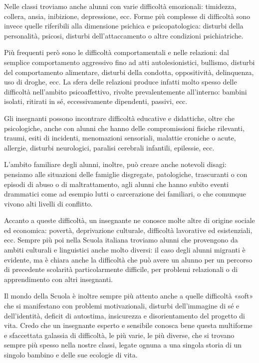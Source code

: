 Nelle classi troviamo anche alunni con varie difficoltà emozionali: timidezza, collera, ansia,
inibizione, depressione, ecc. Forme più complesse di difficoltà sono invece quelle riferibili alla
dimensione psichica e psicopatologica: disturbi della personalità, psicosi, disturbi
dell'attaccamento o altre condizioni psichiatriche.

Più frequenti però sono le difficoltà comportamentali e nelle relazioni: dal semplice
comportamento aggressivo fino ad atti autolesionistici, bullismo, disturbi del comportamento
alimentare, disturbi della condotta, oppositività, delinquenza, uso di droghe, ecc. La sfera delle
relazioni produce infatti molto spesso delle difficoltà nell'ambito psicoaffettivo, rivolte
prevalentemente all'interno: bambini isolati, ritirati in sé, eccessivamente dipendenti, passivi, ecc.

Gli insegnanti possono incontrare difficoltà educative e didattiche, oltre che psicologiche,
anche con alunni che hanno delle compromissioni fisiche rilevanti, traumi, esiti di incidenti,
menomazioni sensoriali, malattie croniche o acute, allergie, disturbi neurologici, paralisi cerebrali
infantili, epilessie, ecc.

L'ambito familiare degli alunni, inoltre, può creare anche notevoli disagi: pensiamo alle
situazioni delle famiglie disgregate, patologiche, trascuranti o con episodi di abuso o di
maltrattamento, agli alunni che hanno subito eventi drammatici come ad esempio lutti o
carcerazione dei familiari, o che comunque vivono alti livelli di conflitto.

Accanto a queste difficoltà, un insegnante ne conosce molte altre di origine sociale ed
economica: povertà, deprivazione culturale, difficoltà lavorative ed esistenziali, ecc. Sempre più poi
nella Scuola italiana troviamo alunni che provengono da ambiti culturali e linguistici anche molto
diversi: il caso degli alunni migranti è evidente, ma è chiara anche la difficoltà che può avere un
alunno per un percorso di precedente scolarità particolarmente difficile, per problemi relazionali o
di apprendimento con altri insegnanti.

Il mondo della Scuola è inoltre sempre più attento anche a quelle difficoltà «soft» che si
manifestano con problemi motivazionali, disturbi dell'immagine di sé e dell'identità, deficit di
autostima, insicurezza e disorientamento del progetto di vita. Credo che un insegnante esperto e
sensibile conosca bene questa multiforme e sfaccettata galassia di difficoltà, le più varie, le più
diverse, che si trovano sempre più spesso nella nostre classi, legate ognuna a una singola storia di
un singolo bambino e delle sue ecologie di vita.

